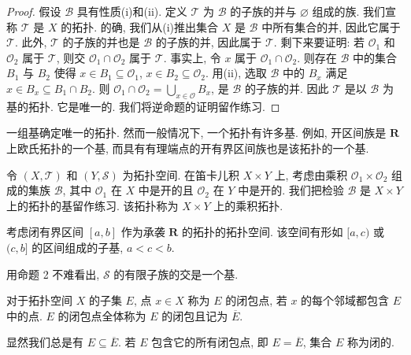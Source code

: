 \documentclass[../../main.tex]{subfiles}
\begin{document}
\begin{proof}
假设 $\mathcal{B}$ 具有性质(i)和(ii). 定义 $\mathcal{T}$ 为 $\mathcal{B}$ 的子族的并与 $\varnothing$ 组成的族. 我们宣称 $\mathcal{T}$ 是 $X$ 的拓扑. 的确, 我们从(i)推出集合 $X$ 是 $\mathcal{B}$ 中所有集合的并, 因此它属于 $\mathcal{T}$. 此外, $\mathcal{T}$ 的子族的并也是 $\mathcal{B}$ 的子族的并, 因此属于 $\mathcal{T}$. 剩下来要证明: 若 $\mathcal{O}_{1}$ 和 $\mathcal{O}_{2}$ 属于 $\mathcal{T}$, 则交 $\mathcal{O}_{1}\cap\mathcal{O}_{2}$ 属于 $\mathcal{T}$. 事实上, 令 $x$ 属于 $\mathcal{O}_{1}\cap\mathcal{O}_{2}$. 则存在 $\mathcal{B}$ 中的集合 $B_{1}$ 与 $B_{2}$ 使得 $x\in B_{1}\subseteq\mathcal{O}_{1}$, $x\in B_{2}\subseteq\mathcal{O}_{2}$. 用(ii), 选取 $\mathcal{B}$ 中的 $B_{x}$ 满足 $x\in B_{x}\subseteq B_{1}\cap B_{2}$. 则 $\mathcal{O}_{1}\cap\mathcal{O}_{2}=\bigcup_{x\in\mathcal{O}}B_{x}$, 是 $\mathcal{B}$ 的子族的并. 因此 $\mathcal{T}$ 是以 $\mathcal{B}$ 为基的拓扑. 它是唯一的. 我们将逆命题的证明留作练习.
\end{proof}

一组基确定唯一的拓扑. 然而一般情况下, 一个拓扑有许多基. 例如, 开区间族是 $\mathbf{R}$ 上欧氏拓扑的一个基, 而具有有理端点的开有界区间族也是该拓扑的一个基.

\begin{example}[乘积拓扑]\label{example:ch11-乘积拓扑}
令 $(X,\mathcal{T})$ 和 $(Y,\mathcal{S})$ 为拓扑空间. 在笛卡儿积 $X\times Y$ 上, 考虑由乘积 $\mathcal{O}_{1}\times\mathcal{O}_{2}$ 组成的集族 $\mathcal{B}$, 其中 $\mathcal{O}_{1}$ 在 $X$ 中是开的且 $\mathcal{O}_{2}$ 在 $Y$ 中是开的. 我们把检验 $\mathcal{B}$ 是 $X\times Y$ 上的拓扑的基留作练习. 该拓扑称为 $X\times Y$ 上的乘积拓扑.
\end{example}

\begin{example}\label{example:ch11-子基例}
考虑闭有界区间 $[a,b]$ 作为承袭 $\mathbf{R}$ 的拓扑的拓扑空间. 该空间有形如 $[a,c)$ 或 $(c,b]$ 的区间组成的子基, $a<c<b$.

用命题 2 不难看出, $\mathcal{S}$ 的有限子族的交是一个基.
\end{example}

\begin{definition}[闭包点与闭包]\label{definition:ch11-闭包}
对于拓扑空间 $X$ 的子集 $E$, 点 $x\in X$ 称为 $E$ 的闭包点, 若 $x$ 的每个邻域都包含 $E$ 中的点. $E$ 的闭包点全体称为 $E$ 的闭包且记为 $\overline{E}$.
\end{definition}

显然我们总是有 $E\subseteq\overline{E}$. 若 $E$ 包含它的所有闭包点, 即 $E=\overline{E}$, 集合 $E$ 称为闭的.
\end{document}
